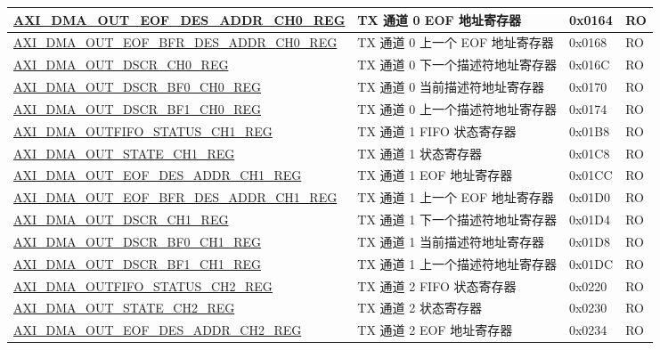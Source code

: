 \begin{longtable}{ | l | l | p{1.3cm} | l | }
\hyperref[regdesc:AXIDMAOUTEOFDESADDRCHNREG]{AXI\_DMA\_OUT\_EOF\_DES\_ADDR\_CH0\_REG} & TX 通道 0 EOF 地址寄存器 & 0x0164 & RO \\ \hline
\hyperref[regdesc:AXIDMAOUTEOFBFRDESADDRCHNREG]{AXI\_DMA\_OUT\_EOF\_BFR\_DES\_ADDR\_CH0\_REG} & TX 通道 0 上一个 EOF 地址寄存器 & 0x0168 & RO \\ \hline
\hyperref[regdesc:AXIDMAOUTDSCRCHNREG]{AXI\_DMA\_OUT\_DSCR\_CH0\_REG} & TX 通道 0 下一个描述符地址寄存器 & 0x016C & RO \\ \hline
\hyperref[regdesc:AXIDMAOUTDSCRBF0CHNREG]{AXI\_DMA\_OUT\_DSCR\_BF0\_CH0\_REG} & TX 通道 0 当前描述符地址寄存器 & 0x0170 & RO \\ \hline
\hyperref[regdesc:AXIDMAOUTDSCRBF1CHNREG]{AXI\_DMA\_OUT\_DSCR\_BF1\_CH0\_REG} & TX 通道 0 上一个描述符地址寄存器 & 0x0174 & RO \\ \hline
\hyperref[regdesc:AXIDMAOUTFIFOSTATUSCHNREG]{AXI\_DMA\_OUTFIFO\_STATUS\_CH1\_REG} & TX 通道 1 FIFO 状态寄存器 & 0x01B8 & RO \\ \hline
\hyperref[regdesc:AXIDMAOUTSTATECHNREG]{AXI\_DMA\_OUT\_STATE\_CH1\_REG} & TX 通道 1 状态寄存器 & 0x01C8 & RO \\ \hline
\hyperref[regdesc:AXIDMAOUTEOFDESADDRCHNREG]{AXI\_DMA\_OUT\_EOF\_DES\_ADDR\_CH1\_REG} & TX 通道 1 EOF 地址寄存器 & 0x01CC & RO \\ \hline
\hyperref[regdesc:AXIDMAOUTEOFBFRDESADDRCHNREG]{AXI\_DMA\_OUT\_EOF\_BFR\_DES\_ADDR\_CH1\_REG} & TX 通道 1 上一个 EOF 地址寄存器 & 0x01D0 & RO \\ \hline
\hyperref[regdesc:AXIDMAOUTDSCRCHNREG]{AXI\_DMA\_OUT\_DSCR\_CH1\_REG} & TX 通道 1 下一个描述符地址寄存器 & 0x01D4 & RO \\ \hline
\hyperref[regdesc:AXIDMAOUTDSCRBF0CHNREG]{AXI\_DMA\_OUT\_DSCR\_BF0\_CH1\_REG} & TX 通道 1 当前描述符地址寄存器 & 0x01D8 & RO \\ \hline
\hyperref[regdesc:AXIDMAOUTDSCRBF1CHNREG]{AXI\_DMA\_OUT\_DSCR\_BF1\_CH1\_REG} & TX 通道 1 上一个描述符地址寄存器 & 0x01DC & RO \\ \hline
\hyperref[regdesc:AXIDMAOUTFIFOSTATUSCHNREG]{AXI\_DMA\_OUTFIFO\_STATUS\_CH2\_REG} & TX 通道 2 FIFO 状态寄存器 & 0x0220 & RO \\ \hline
\hyperref[regdesc:AXIDMAOUTSTATECHNREG]{AXI\_DMA\_OUT\_STATE\_CH2\_REG} & TX 通道 2 状态寄存器 & 0x0230 & RO \\ \hline
\hyperref[regdesc:AXIDMAOUTEOFDESADDRCHNREG]{AXI\_DMA\_OUT\_EOF\_DES\_ADDR\_CH2\_REG} & TX 通道 2 EOF 地址寄存器 & 0x0234 & RO \\ \hline

\end{longtable}
